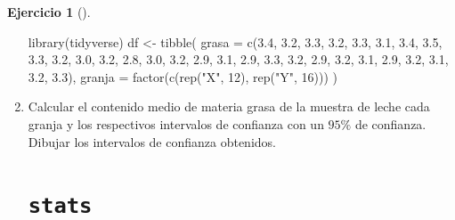 \documentclass[
  a4paper,
]{scrreport}
\newenvironment{Shaded}{\begin{snugshade}}{\end{snugshade}}
\newcommand{\AttributeTok}[1]{\textcolor[rgb]{0.40,0.45,0.13}{#1}}
\newcommand{\DecValTok}[1]{\textcolor[rgb]{0.68,0.00,0.00}{#1}}
\newcommand{\FloatTok}[1]{\textcolor[rgb]{0.68,0.00,0.00}{#1}}
\newcommand{\FunctionTok}[1]{\textcolor[rgb]{0.28,0.35,0.67}{#1}}
\newcommand{\NormalTok}[1]{\textcolor[rgb]{0.00,0.23,0.31}{#1}}
\newcommand{\OtherTok}[1]{\textcolor[rgb]{0.00,0.23,0.31}{#1}}
\newcommand{\StringTok}[1]{\textcolor[rgb]{0.13,0.47,0.30}{#1}}
\theoremstyle{definition}
\newtheorem{exercise}{Ejercicio}[chapter]
\theoremstyle{remark}
\begin{document}
\begin{exercise}[]
\begin{enumerate}
\begin{tcolorbox}
\begin{Shaded}
\begin{Highlighting}[]
\FunctionTok{library}\NormalTok{(tidyverse)}
\NormalTok{df }\OtherTok{\textless{}{-}} \FunctionTok{tibble}\NormalTok{(}
    \AttributeTok{grasa =} \FunctionTok{c}\NormalTok{(}\FloatTok{3.4}\NormalTok{, }\FloatTok{3.2}\NormalTok{, }\FloatTok{3.3}\NormalTok{, }\FloatTok{3.2}\NormalTok{, }\FloatTok{3.3}\NormalTok{, }\FloatTok{3.1}\NormalTok{, }\FloatTok{3.4}\NormalTok{, }\FloatTok{3.5}\NormalTok{, }\FloatTok{3.3}\NormalTok{, }\FloatTok{3.2}\NormalTok{, }\FloatTok{3.0}\NormalTok{, }\FloatTok{3.2}\NormalTok{, }\FloatTok{2.8}\NormalTok{, }\FloatTok{3.0}\NormalTok{, }\FloatTok{3.2}\NormalTok{, }\FloatTok{2.9}\NormalTok{, }\FloatTok{3.1}\NormalTok{, }\FloatTok{2.9}\NormalTok{, }\FloatTok{3.3}\NormalTok{, }\FloatTok{3.2}\NormalTok{, }\FloatTok{2.9}\NormalTok{, }\FloatTok{3.2}\NormalTok{, }\FloatTok{3.1}\NormalTok{, }\FloatTok{2.9}\NormalTok{, }\FloatTok{3.2}\NormalTok{, }\FloatTok{3.1}\NormalTok{, }\FloatTok{3.2}\NormalTok{, }\FloatTok{3.3}\NormalTok{),}
    \AttributeTok{granja =} \FunctionTok{factor}\NormalTok{(}\FunctionTok{c}\NormalTok{(}\FunctionTok{rep}\NormalTok{(}\StringTok{"X"}\NormalTok{, }\DecValTok{12}\NormalTok{), }\FunctionTok{rep}\NormalTok{(}\StringTok{"Y"}\NormalTok{, }\DecValTok{16}\NormalTok{)))}
\NormalTok{)}
\end{Highlighting}
\end{Shaded}

  \end{tcolorbox}
\item
  Calcular el contenido medio de materia grasa de la muestra de leche
  cada granja y los respectivos intervalos de confianza con un \(95\%\)
  de confianza. Dibujar los intervalos de confianza obtenidos.

  \begin{tcolorbox}[enhanced jigsaw, toprule=.15mm, rightrule=.15mm, arc=.35mm, colback=white, colbacktitle=quarto-callout-tip-color!10!white, toptitle=1mm, left=2mm, colframe=quarto-callout-tip-color-frame, opacityback=0, breakable, opacitybacktitle=0.6, bottomtitle=1mm, titlerule=0mm, title=\textcolor{quarto-callout-tip-color}{\faLightbulb}\hspace{0.5em}{Solución}, bottomrule=.15mm, coltitle=black, leftrule=.75mm]

  \section{\texorpdfstring{\texttt{stats}}{stats}}


\end{tcolorbox}
\end{enumerate}
\end{exercise}
\end{document}
